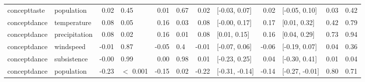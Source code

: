 \begin{table}[ht]
\begin{tabular}{llrlrlrlrlrr}
  concepttaste & population & 0.02 & 0.45 & 0.01 & 0.67 & 0.02 & [-0.03, 0.07] & 0.02 & [-0.05, 0.10] & 0.03 & 0.42 \\ 
  conceptdance & temperature & 0.08 & 0.05 & 0.16 & 0.03 & 0.08 & [-0.00, 0.17] & 0.17 & [0.01, 0.32] & 0.42 & 0.79 \\ 
  conceptdance & precipitation & 0.08 & 0.02 & 0.16 & 0.01 & 0.08 & [0.01, 0.15] & 0.16 & [0.04, 0.29] & 0.73 & 0.94 \\ 
  conceptdance & windspeed & -0.01 & 0.87 & -0.05 & 0.4 & -0.01 & [-0.07, 0.06] & -0.06 & [-0.19, 0.07] & 0.04 & 0.36 \\ 
  conceptdance & subsistence & -0.00 & 0.99 & 0.00 & 0.98 & 0.01 & [-0.23, 0.25] & 0.04 & [-0.30, 0.41] & 0.01 & 0.04 \\ 
  conceptdance & population & -0.23 & $<$ 0.001 & -0.15 & 0.02 & -0.22 & [-0.31, -0.14] & -0.14 & [-0.27, -0.01] & 0.80 & 0.71 \\ 
   \hline
\end{tabular}
\end{table}
